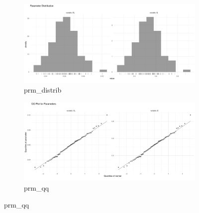 \begin{figure}[htbp]
    \begin{subfigure}[b]{0.45\linewidth}
        \centering
        \includegraphics[width=\linewidth]{fig/img/Xpose/prm_distrib.pdf}
        \caption{prm\_distrib}
        \label{fig:prm_distrib}
    \end{subfigure}
    \hfill
    \begin{subfigure}[b]{0.45\linewidth}
        \centering
        \includegraphics[width=\linewidth]{fig/img/Xpose/prm_qq.pdf}
        \caption{prm\_qq}
        \label{fig:prm_qq}
    \end{subfigure}
\end{figure}





